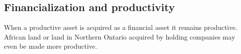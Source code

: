 \subsection{Financialization and productivity}

When  a productive asset is acquired as a financial asset it remains productive. African land or land in Northern Ontario acquired by holding companies may even be made more productive. 


